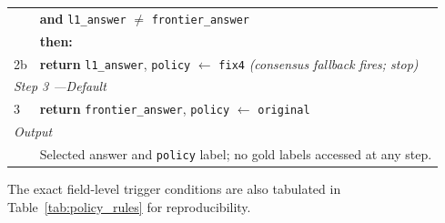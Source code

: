 \begin{table}[t]
\begin{tabular}{p{} p{}}
   & \quad \textbf{and} \texttt{l1\_answer} $\neq$ \texttt{frontier\_answer} \\
   & \textbf{then:} \\
2b & \quad \textbf{return} \texttt{l1\_answer}, \texttt{policy} $\leftarrow$ \texttt{fix4} \quad\quad \textit{(consensus fallback fires; stop)} \\
\midrule
\multicolumn{2}{l}{\textit{Step 3 ---Default}} \\
3  & \textbf{return} \texttt{frontier\_answer}, \texttt{policy} $\leftarrow$ \texttt{original} \\
\midrule
\multicolumn{2}{l}{\textit{Output}} \\
& Selected answer and \texttt{policy} label; no gold labels accessed at any step. \\
\bottomrule
\end{tabular}
\end{table}

The exact field-level trigger conditions are also tabulated in Table~\ref{tab:policy_rules} for reproducibility.

